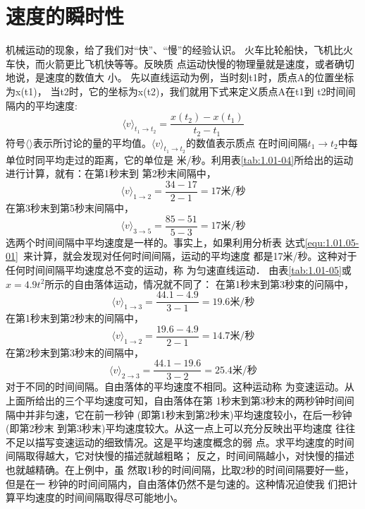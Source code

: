\section{速度的瞬时性}
    机械运动的现象，给了我们对“快”、“慢”的经验认识。
火车比轮船快，飞机比火车快，而火箭更比飞机快等等。反映质
点运动快慢的物理量就是速度，或者确切地说，是速度的数值大
小。
    先以直线运动为例，当时刻t1时，质点A的位置坐标为x(t1)，
当t2时，它的坐标为x(t2)，我们就用下式来定义质点A在t1到
t2时间间隔内的平均速度:
\begin{equation}
    \langle v\rangle_{t_{1} \rightarrow t_{2}}=\frac{x(t_{2})-x(t_{1})}{t_{2}-t_{1}} \label{equ:1.01.06-01}
\end{equation}
符号$\langle \rangle$表示所讨论的量的平均值。$\langle v\rangle_{t_{1} \rightarrow t_{2}}$的数值表示质点
在时间间隔$t_{1} \rightarrow t_{2}$中每单位时同平均走过的距离，它的单位是
米/秒。利用表\ref{tab:1.01-04}所给出的运动进行计算，就有：在第1秒末到
第2秒末间隔中，
\begin{equation*}
    \langle v\rangle_{1 \rightarrow 2}=\frac{34-17}{2-1}=17\text{米/秒}
\end{equation*}
在第3秒末到第5秒末间隔中，
\begin{equation*}
    \langle v\rangle_{3 \rightarrow 5}=\frac{85-51}{5-3}=17\text{米/秒}
\end{equation*}
选两个时间间隔中平均速度是一样的。事实上，如果利用分析表
达式\ref{equ:1.01.05-01}~来计算，就会发现对任何时间间隔，运动的平均速度
都是17米/秒。这种对于任何时间间隔平均速度总不变的运动，称
为匀速直线运动．
    由表\ref{tab:1.01-05}或$x=4.9t^2$所示的自由落体运动，情况就不同了：
在第1秒末到第3秒束的问隔中，
\begin{equation*}
    \langle v\rangle_{1 \rightarrow 3}=\frac{44.1-4.9}{3-1}=19.6\text{米/秒}
\end{equation*}
在第1秒末到第2秒末的间隔中，
\begin{equation*}
    \langle v\rangle_{1 \rightarrow 2}=\frac{19.6-4.9}{2-1}=14.7\text{米/秒}
\end{equation*}
在第2秒末到第3秒末的间隔中，
\begin{equation*}
    \langle v\rangle_{2 \rightarrow 3}=\frac{44.1-19.6}{3-2}=25.4\text{米/秒}
\end{equation*}
对于不同的时间间隔。自由落体的平均速度不相同。这种运动称
为变速运动。从上面所给出的三个平均速度可知，自由落体在第
1秒末到第3秒末的两秒钟时间间隔中并非匀速，它在前一秒钟
(即第1秒末到第2秒末)平均速度较小，在后一秒钟(即第2秒末
到第3秒末)平均速度较大。从这一点上可以充分反映出平均速度
往往不足以描写变速运动的细致情况。这是平均速度概念的弱
点。求平均速度的时间间隔取得越大，它对快慢的描述就越粗略；
反之，时间间隔越小，对快慢的描述也就越精确。在上例中，虽
然取1秒的时间间隔，比取2秒的时间间隔要好一些，但是在一
秒钟的时间间隔内，自由落体仍然不是匀速的。这种情况迫使我
们把计算平均速度的时间间隔取得尽可能地小。

